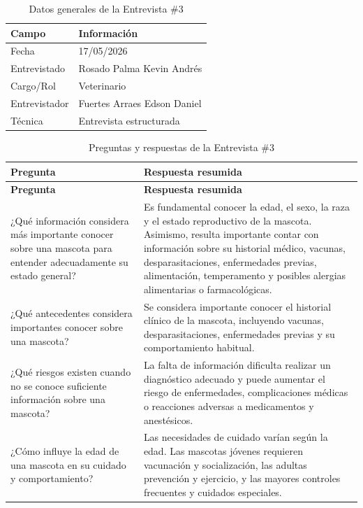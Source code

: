 \documentclass[journal,onecolumn]{IEEEtran}
\begin{document}
\begin{table}[H]
\caption{Datos generales de la Entrevista \#3}
\label{tab:datos_e3}
\begin{tabularx}{\textwidth}{|p{4cm}|X|}
\hline
\textbf{Campo} & \textbf{Información} \\
\hline
Fecha & 17/05/2026 \\
\hline
Entrevistado & Rosado Palma Kevin Andrés \\
\hline
Cargo/Rol & Veterinario \\
\hline
Entrevistador & Fuertes Arraes Edson Daniel \\
\hline
Técnica & Entrevista estructurada \\
\hline
\end{tabularx}
\end{table}

\begin{longtable}{|p{7.5cm}|p{7.5cm}|}
\caption{Preguntas y respuestas de la Entrevista \#3}
\label{tab:pr_e3}\\
\hline
\textbf{Pregunta} & \textbf{Respuesta resumida} \\
\hline
\endfirsthead
\hline
\textbf{Pregunta} & \textbf{Respuesta resumida} \\
\hline
\endhead
¿Qué información considera más importante conocer sobre una mascota para entender adecuadamente su estado general? & Es fundamental conocer la edad, el sexo, la raza y el estado reproductivo de la mascota. Asimismo, resulta importante contar con información sobre su historial médico, vacunas, desparasitaciones, enfermedades previas, alimentación, temperamento y posibles alergias alimentarias o farmacológicas. \\
\hline
¿Qué antecedentes considera importantes conocer sobre una mascota? & Se considera importante conocer el historial clínico de la mascota, incluyendo vacunas, desparasitaciones, enfermedades previas y su comportamiento habitual. \\
\hline
¿Qué riesgos existen cuando no se conoce suficiente información sobre una mascota? & La falta de información dificulta realizar un diagnóstico adecuado y puede aumentar el riesgo de enfermedades, complicaciones médicas o reacciones adversas a medicamentos y anestésicos. \\
\hline
¿Cómo influye la edad de una mascota en su cuidado y comportamiento? & Las necesidades de cuidado varían según la edad. Las mascotas jóvenes requieren vacunación y socialización, las adultas prevención y ejercicio, y las mayores controles frecuentes y cuidados especiales. \\

\end{longtable}
\end{document}
